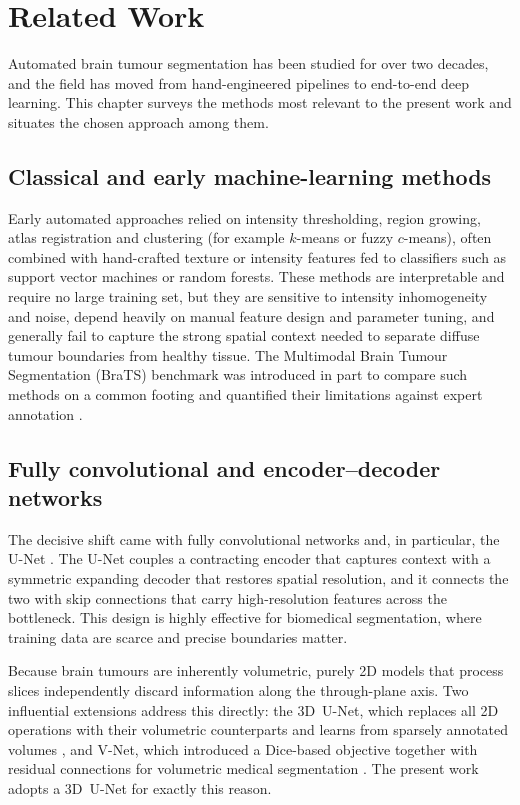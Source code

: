 \chapter{Related Work}
\label{ch:related}

Automated brain tumour segmentation has been studied for over two decades, and
the field has moved from hand-engineered pipelines to end-to-end deep learning.
This chapter surveys the methods most relevant to the present work and situates
the chosen approach among them.

\section{Classical and early machine-learning methods}

Early automated approaches relied on intensity thresholding, region growing,
atlas registration and clustering (for example $k$-means or fuzzy $c$-means),
often combined with hand-crafted texture or intensity features fed to classifiers
such as support vector machines or random forests. These methods are
interpretable and require no large training set, but they are sensitive to
intensity inhomogeneity and noise, depend heavily on manual feature design and
parameter tuning, and generally fail to capture the strong spatial context needed
to separate diffuse tumour boundaries from healthy tissue. The Multimodal Brain
Tumour Segmentation (BraTS) benchmark was introduced in part to compare such
methods on a common footing and quantified their limitations against expert
annotation \citep{menze2015brats}.

\section{Fully convolutional and encoder--decoder networks}

The decisive shift came with fully convolutional networks and, in particular, the
U-Net \citep{ronneberger2015unet}. The U-Net couples a contracting encoder that
captures context with a symmetric expanding decoder that restores spatial
resolution, and it connects the two with skip connections that carry
high-resolution features across the bottleneck. This design is highly effective
for biomedical segmentation, where training data are scarce and precise
boundaries matter.

Because brain tumours are inherently volumetric, purely 2D models that process
slices independently discard information along the through-plane axis.
Two influential extensions address this directly: the 3D~U-Net, which replaces
all 2D operations with their volumetric counterparts and learns from sparsely
annotated volumes \citep{cicek20163dunet}, and V-Net, which introduced a
Dice-based objective together with residual connections for volumetric medical
segmentation \citep{milletari2016vnet}. The present work adopts a 3D~U-Net for
exactly this reason.

